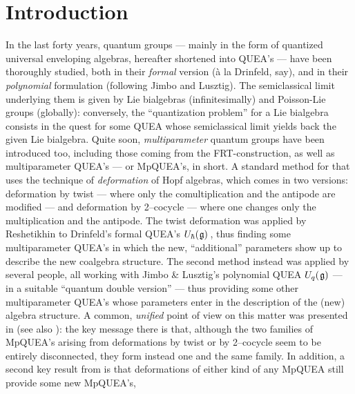 \documentclass[12pt,reqno,twoside,a4paper]{amsart}
\numberwithin{equation}{section}
\theoremstyle{definition}
\newtheorem{free text}[lema]{}
\theoremstyle{remark}
\def \lieg{\mathfrak{g}}
\def \uhg{U_\hbar(\hskip0,5pt\lieg)}
\def \uqg{U_q(\hskip0,8pt\lieg)}
\theoremstyle{plain}
\begin{document}



\section{Introduction}  \label{sec: intro}

\vskip7pt

   In the last forty years, quantum groups
 --- mainly in the form of quantized universal enveloping algebras, hereafter shortened into QUEA's ---
 have been thoroughly studied, both in their  \textsl{formal\/}  version (\`a la Drinfeld, say),
 and in their  \textsl{polynomial\/}  formulation (following Jimbo and Lusztig).
 The semiclassical limit underlying them is given by Lie bialgebras (infinitesimally)
 and Poisson-Lie groups (globally): conversely, the ``quantization problem'' for
 a Lie bialgebra consists in the quest for some QUEA whose semiclassical
 limit yields back the given Lie bialgebra.
%
 \vskip5pt
%
   Quite soon,  \textit{multiparameter\/}  quantum groups have been introduced too, including those coming from the FRT-construction, as well as multiparameter QUEA's   --- or MpQUEA's, in short.
   A standard method for that uses the technique of  \textit{deformation\/}  of Hopf algebras,
   which comes in two versions: deformation by twist   --- where only the comultiplication
   and the antipode are modified ---   and deformation by 2--cocycle
   --- where one changes only the multiplication and the antipode.
   The twist deformation was applied by Reshetikhin to Drinfeld's formal QUEA's
   $ \uhg \, $,  thus finding some multiparameter QUEA's in which the new,
   ``additional'' parameters show up to describe the new coalgebra structure.
   The second method instead was applied by several people, all working with Jimbo \& Lusztig's
   polynomial QUEA  $ \uqg $   --- in a suitable ``quantum double version'' ---
   thus providing some other multiparameter QUEA's whose parameters enter
   in the description of the (new) algebra structure.  A common,  \textsl{unified\/}
   point of view on this matter was presented in  \cite{GG3}  (see also  \cite{GG1}):
   the key message there is that, although the two families of MpQUEA's arising
   from deformations by twist or by 2--cocycle seem to be entirely disconnected,
   they form instead one and the same family.  In addition, a second key result from  \cite{GG3}  is that
   deformations of either kind of any MpQUEA still provide some new MpQUEA's,
\end{document}
